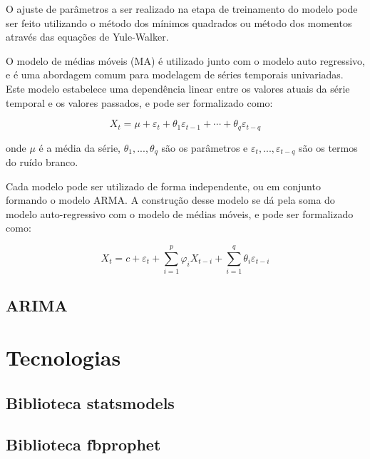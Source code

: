 O ajuste de parâmetros a ser realizado na etapa de treinamento do modelo pode ser feito utilizando o método dos mínimos quadrados ou método dos momentos através das equações de Yule-Walker.

O modelo de médias móveis (MA) é utilizado junto com o modelo auto regressivo, e é uma abordagem comum para modelagem de séries temporais univariadas. Este modelo estabelece uma dependência linear entre os valores atuais da série temporal e os valores passados, e pode ser formalizado como:

\[X_{t}=\mu+\varepsilon_{t}+\theta_{1} \varepsilon_{t-1}+\cdots+\theta_{q} \varepsilon_{t-q}\]

onde $\mu$ é a média da série, $\theta_{1}, ..., \theta_{q}$ são os parâmetros e $\varepsilon_{t}, ..., \varepsilon_{t-q}$ são os termos do ruído branco.

Cada modelo pode ser utilizado de forma independente, ou em conjunto formando o modelo ARMA. A construção desse modelo se dá pela soma do modelo auto-regressivo com o modelo de médias móveis, e pode ser formalizado como:

\[X_{t}=c+\varepsilon_{t}+\sum_{i=1}^{p} \varphi_{i} X_{t-i}+\sum_{i=1}^{q} \theta_{i} \varepsilon_{t-i}\]

\subsection{ARIMA}



\section{Tecnologias}
\subsection{Biblioteca statsmodels}


\subsection{Biblioteca fbprophet}
\cite{fbprophet}


